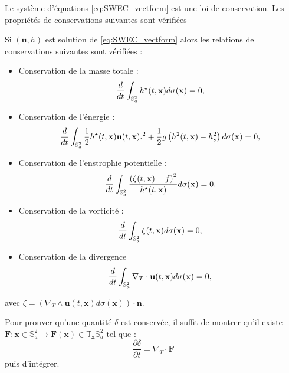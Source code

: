 Le système d'équations \eqref{eq:SWEC_vectform} est une loi de conservation. Les propriétés de conservations suivantes sont vérifiées

\begin{proposition}
\label{prop:swe_cons}
Si $(\mathbf{u},h)$ est solution de \eqref{eq:SWEC_vectform} alors les relations de conservations suivantes sont vérifiées :
\begin{itemize}
\item Conservation de la masse totale :
\begin{equation}
\dfrac{d}{dt} \displaystyle\int_{\mathbb{S}_a^2} h^{\star}(t,\mathbf{x}) d \sigma(\mathbf{x}) = 0,
\label{eq:mass}
\end{equation}
 
\item Conservation de l'énergie :
\begin{equation}
\dfrac{d}{dt} \displaystyle\int_{\mathbb{S}_a^2} \dfrac{1}{2} h^{\star}(t,\mathbf{x}) \mathbf{u}(t,\mathbf{x}).^2 + \dfrac{1}{2} g \left( h^2(t,\mathbf{x}) - h_s^2 \right)d \sigma(\mathbf{x}) = 0,
\label{eq:energy}
\end{equation}

\item Conservation de l'enstrophie potentielle :
\begin{equation}
\dfrac{d}{dt} \displaystyle\int_{\mathbb{S}_a^2} \dfrac{\left( \zeta(t,\mathbf{x}) + f \right)^2}{h^{\star}(t,\mathbf{x})} d \sigma(\mathbf{x}) = 0,
\label{eq:enstrophie}
\end{equation}

\item Conservation de la vorticité :
\begin{equation}
\dfrac{d}{dt} \displaystyle\int_{\mathbb{S}_a^2} \zeta(t,\mathbf{x}) d \sigma(\mathbf{x}) = 0,
\label{eq:vorticity}
\end{equation}

\item Conservation de la divergence
\begin{equation}
\dfrac{d}{dt} \displaystyle\int_{\mathbb{S}_a^2} \nabla_T \cdot \mathbf{u}(t,\mathbf{x}) d \sigma(\mathbf{x}) = 0,
\label{eq:divergence}
\end{equation}
\end{itemize}

avec $\zeta = \left( \nabla_T \wedge \mathbf{u}(t,\mathbf{x}) d \sigma(\mathbf{x}) \right) \cdot \mathbf{n}$.
\end{proposition}

\begin{remarque}
Pour prouver qu'une quantité $\delta$ est conservée, il suffit de montrer qu'il existe $\mathbf{F} : \mathbf{x} \in \mathbb{S}_a^2 \mapsto \mathbf{F}(\mathbf{x}) \in \mathbb{T}_{\mathbf{x}} \mathbb{S}_a^2$ tel que :
\begin{equation}
\dfrac{\partial \delta}{\partial t} = \nabla_T \cdot \mathbf{F}
\end{equation}
puis d'intégrer.
\label{rmq:int diverg nulle}
\end{remarque}

